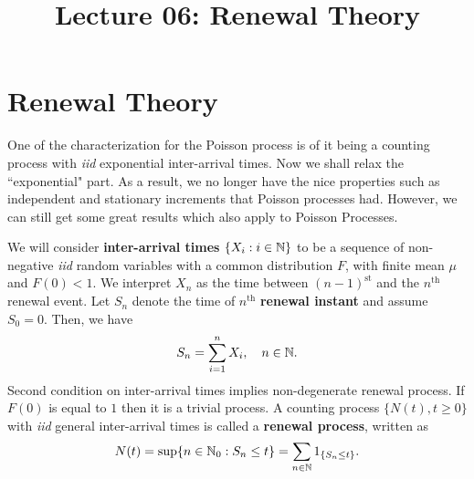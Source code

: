 \documentclass[a4paper,10pt, english]{article}
\title{Lecture 06: Renewal Theory}
\author{}
\begin{document}
\maketitle

\section{Renewal Theory}
One of the characterization for the Poisson process is of it being a counting process with \emph{iid} exponential inter-arrival times. 
Now we shall relax the ``exponential" part. 
As a result, we no longer have the nice properties such as independent and stationary increments that Poisson processes had. 
However, we can still get some great results which also apply to Poisson Processes. 

We will consider \textbf{inter-arrival times} $\{X_i: i \in \mathbb{N}\}$ to be a sequence of non-negative \emph{iid} random variables with a common distribution $F$, 
with finite mean $\mu$ and $F(0) < 1$. 
We interpret $X_n$ as the time between $(n - 1)^{\text{st}}$ and the $n^{\text{th}}$ renewal event. 
Let $S_n$ denote the time of $n^{\text{th}}$ \textbf{renewal instant} and assume $S_0 = 0$. 
Then, we have
\begin{align*} 
S_n = \sum_{i=1}^n X_i, \quad n\in \mathbb{N}. 
\end{align*}
Second condition on inter-arrival times implies non-degenerate renewal process. 
If $F(0)$ is equal to $1$ then it is a trivial process. 
A counting process $\{N(t),t \geq 0\}$ with \emph{iid} general inter-arrival times is called a \textbf{renewal process}, written as 
	\begin{align*} 
	N(t) = \sup\{n \in \mathbb{N}_0 : S_n \leq t\} = \sum_{n \in \mathbb{N}}1_{\{S_n \leq t\}}.
	\end{align*} 
\end{document}
